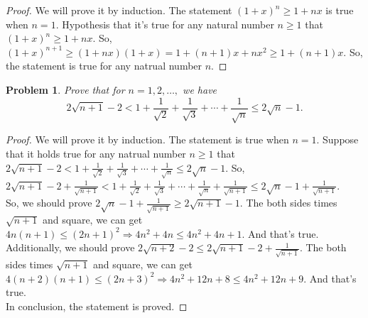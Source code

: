 \documentclass[12pt]{article}
\newtheorem{hw}{Problem}
\begin{document}
\begin{proof}
    We will prove it by induction. The statement $(1+x)^n\geq 1+nx$ is true when $n=1$. Hypothesis that it's true for any natural number $n\geqslant 1$ that $(1+x)^n\geq 1+nx$. So, $(1+x)^{n+1}\geq (1+nx)(1+x)=1+(n+1)x+nx^2\geq 1+(n+1)x$. So, the statement is true for any natrual number $n$.
\end{proof}

\begin{hw} Prove that for $n=1,2,\ldots,$ we have
\[
2\sqrt{n+1}-2<1+\frac{1}{\sqrt{2}}+\frac{1}{\sqrt{3}}+\cdots +\frac{1}{\sqrt{n}}\leq 2\sqrt{n}-1.
\]
\end{hw}

\begin{proof}
    We will prove it by induction. The statement is true when $n=1$. Suppose that it holds true for any natrual number $n\geq 1$ that $2\sqrt{n+1}-2<1+\frac{1}{\sqrt{2}}+\frac{1}{\sqrt{3}}+\cdots +\frac{1}{\sqrt{n}}\leq 2\sqrt{n}-1$. 
    So, $2\sqrt{n+1}-2+ \frac{1}{\sqrt{n+1}}<1+\frac{1}{\sqrt{2}}+\frac{1}{\sqrt{3}}+\cdots +\frac{1}{\sqrt{n}} + \frac{1}{\sqrt{n+1}}\leq 2\sqrt{n}-1+ \frac{1}{\sqrt{n+1}}$.\\
    So, we should prove $2\sqrt{n}-1+ \frac{1}{\sqrt{n+1}}\geq 2\sqrt{n+1}-1$. The both sides times $\sqrt{n+1}$ and square, we can get $4n(n+1)\leq (2n+1)^2\Rightarrow 4n^2+4n\leq 4n^2+4n+1$. And that's true.\\
    Additionally, we should prove $2\sqrt{n+2}-2\leq 2\sqrt{n+1}-2+ \frac{1}{\sqrt{n+1}}$. The both sides times $\sqrt{n+1}$ and square, we can get $4(n+2)(n+1)\leq (2n+3)^2\Rightarrow 4n^2+12n+8\leq 4n^2+12n+9$. And that's true.\\
    In conclusion, the statement is proved.
\end{proof}
\end{document}
